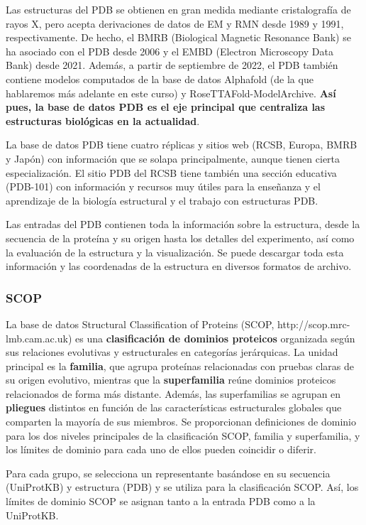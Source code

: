 Las estructuras del PDB se obtienen en gran medida mediante cristalografía de rayos X, pero acepta derivaciones de datos de EM y RMN desde 1989 y 1991, respectivamente. De hecho, el BMRB (Biological Magnetic Resonance Bank) se ha asociado con el PDB desde 2006 y el EMBD (Electron Microscopy Data Bank) desde 2021. Además, a partir de septiembre de 2022, el PDB también contiene modelos computados de la base de datos Alphafold (de la que hablaremos más adelante en este curso) y RoseTTAFold-ModelArchive. \textbf{Así pues, la base de datos PDB es el eje principal que centraliza las estructuras biológicas en la actualidad}.

La base de datos PDB tiene cuatro réplicas y sitios web (RCSB, Europa, BMRB y Japón) con información que se solapa principalmente, aunque tienen cierta especialización. El sitio PDB del RCSB tiene también una sección educativa (PDB-101) con información y recursos muy útiles para la enseñanza y el aprendizaje de la biología estructural y el trabajo con estructuras PDB.


Las entradas del PDB contienen toda la información sobre la estructura, desde la secuencia de la proteína y su origen hasta los detalles del experimento, así como la evaluación de la estructura y la visualización. Se puede descargar toda esta información y las coordenadas de la estructura en diversos formatos de archivo.

\subsubsection{SCOP}
La base de datos Structural Classification of Proteins (SCOP, http://scop.mrc-lmb.cam.ac.uk) es una \textbf{clasificación de dominios proteicos} organizada según sus relaciones evolutivas y estructurales en categorías jerárquicas. La unidad principal es la \textbf{familia}, que agrupa proteínas relacionadas con pruebas claras de su origen evolutivo, mientras que la \textbf{superfamilia} reúne dominios proteicos relacionados de forma más distante. Además, las superfamilias se agrupan en \textbf{pliegues} distintos en función de las características estructurales globales que comparten la mayoría de sus miembros. Se proporcionan definiciones de dominio para los dos niveles principales de la clasificación SCOP, familia y superfamilia, y los límites de dominio para cada uno de ellos pueden coincidir o diferir.

Para cada grupo, se selecciona un representante basándose en su secuencia (UniProtKB) y estructura (PDB) y se utiliza para la clasificación SCOP. Así, los límites de dominio SCOP se asignan tanto a la entrada PDB como a la UniProtKB.

